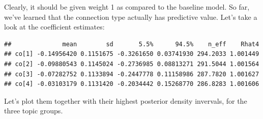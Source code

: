 \documentclass[]{book}
\begin{document}
\normalsize

Clearly, it should be given weight 1 as compared to the baseline model.
So far, we've learned that the connection type actually has predictive
value. Let's take a look at the coefficient estimates:

\vspace{1mm} \footnotesize

\begin{verbatim}
##              mean        sd       5.5%      94.5%    n_eff    Rhat4
## co[1] -0.14956420 0.1151675 -0.3261650 0.03741930 294.2033 1.001449
## co[2] -0.09880543 0.1145024 -0.2736985 0.08813271 291.5044 1.001564
## co[3] -0.07282752 0.1133894 -0.2447778 0.11158986 287.7820 1.001627
## co[4] -0.03103179 0.1131420 -0.2034442 0.15268770 286.8283 1.001606
\end{verbatim}

\normalsize

\noindent Let's plot them together with their highest posterior density
invervals, for the three topic groups.
\end{document}
